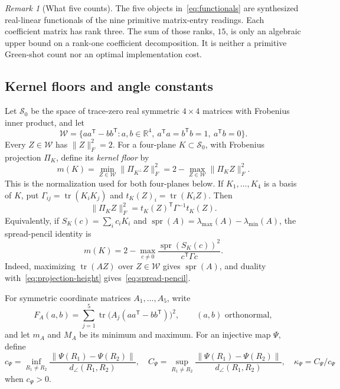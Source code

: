 \documentclass[12pt]{article}
\theoremstyle{definition}
\theoremstyle{remark}
\newtheorem{remark}[theorem]{Remark}
\newcommand{\RR}{\mathbb R}
\newcommand{\tr}{\operatorname{tr}}
\begin{document}
\begin{remark}[What five counts]\label{rem:not-shots}
The five objects in~\eqref{eq:functionals} are synthesized real-linear
functionals of the nine primitive matrix-entry readings.  Each coefficient
matrix has rank three.  The sum of those ranks, $15$, is only an algebraic
upper bound on a rank-one coefficient decomposition.  It is neither a
primitive Green-shot count nor an optimal implementation cost.
\end{remark}

\subsection{Kernel floors and angle constants}\label{sec:conditioning-definitions}

Let $\mathcal S_0$ be the space of trace-zero real symmetric $4\times4$
matrices with Frobenius inner product, and let
\begin{equation}\label{eq:pair-orbit}
 \mathcal W=\{aa^{\mathsf T}-bb^{\mathsf T}:a,b\in\RR^4,
 \ a^{\mathsf T}a=b^{\mathsf T}b=1,\ a^{\mathsf T}b=0\}.
\end{equation}
Every $Z\in\mathcal W$ has $\|Z\|_F^2=2$.  For a four-plane
$K\subset\mathcal S_0$, with Frobenius projection $\Pi_K$, define its
\emph{kernel floor} by
\begin{equation}\label{eq:kernel-floor-definition}
 m(K)=\min_{Z\in\mathcal W}\|\Pi_{K^\perp}Z\|_F^2
     =2-\max_{Z\in\mathcal W}\|\Pi_KZ\|_F^2.
\end{equation}
This is the normalization used for both four-planes below.  If
$K_1,\ldots,K_4$ is a basis of $K$, put
$\Gamma_{ij}=\tr(K_iK_j)$ and
$t_K(Z)_i=\tr(K_iZ)$.  Then
\begin{equation}\label{eq:projection-height}
 \|\Pi_KZ\|_F^2=t_K(Z)^{\mathsf T}\Gamma^{-1}t_K(Z).
\end{equation}
Equivalently, if $S_K(c)=\sum_i c_iK_i$ and
$\operatorname{spr}(A)=\lambda_{\max}(A)-\lambda_{\min}(A)$, the
spread-pencil identity is
\begin{equation}\label{eq:spread-pencil}
 m(K)=2-\max_{c\ne0}
 \frac{\operatorname{spr}(S_K(c))^2}{c^{\mathsf T}\Gamma c}.
\end{equation}
Indeed, maximizing $\tr(AZ)$ over $Z\in\mathcal W$ gives
$\operatorname{spr}(A)$, and duality with~\eqref{eq:projection-height}
gives~\eqref{eq:spread-pencil}.

For symmetric coordinate matrices $A_1,\ldots,A_5$, write
\begin{equation}\label{eq:realized-objective}
 F_A(a,b)=\sum_{j=1}^5
 \tr\!\bigl(A_j(aa^{\mathsf T}-bb^{\mathsf T})\bigr)^2,
 \qquad (a,b)\text{ orthonormal},
\end{equation}
and let $m_A$ and $M_A$ be its minimum and maximum.
For an injective map $\Psi$, define
\[
c_\Psi=\inf_{R_1\ne R_2}\frac{\|\Psi(R_1)-\Psi(R_2)\|}{d_\angle(R_1,R_2)},
\quad C_\Psi=\sup_{R_1\ne R_2}\frac{\|\Psi(R_1)-\Psi(R_2)\|}{d_\angle(R_1,R_2)},
\quad \kappa_\Psi=C_\Psi/c_\Psi
\]
when $c_\Psi>0$.
\end{document}
